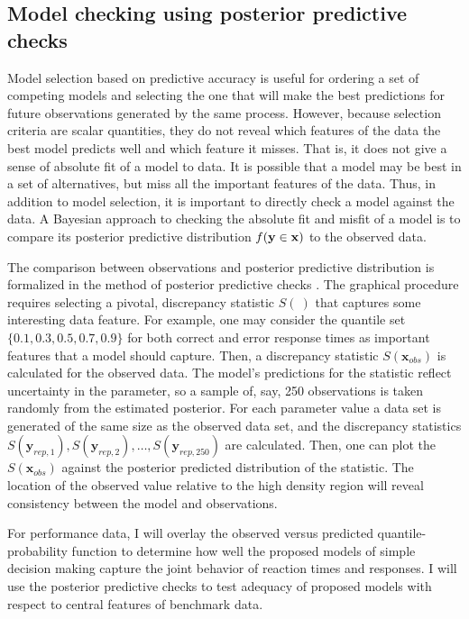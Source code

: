 \documentclass[12pt]{article}
\begin{document}
\subsection{Model checking using posterior predictive checks}

Model selection based on predictive accuracy is useful for ordering a
set of competing models and selecting the one that will make the best
predictions for future observations generated by the same
process. However, because selection criteria are scalar
quantities, they do not reveal which features of the data the
best model predicts well and which feature it misses. That is, it does
not give a sense of absolute fit of a model to data. It is possible
that a model may be best in a set of alternatives, but miss all the
important features of the data. Thus, in addition to model
selection, it is important to directly check a model against the data. A
Bayesian approach to checking the absolute fit and misfit of a
model is to compare its posterior predictive distribution $f(\bf{y} \in \bf{x})$ to the observed data.

The comparison between observations and posterior predictive
distribution is formalized in the method of posterior predictive
checks \citep{GelGoe2000,GelCar2013}.  The graphical procedure requires selecting a pivotal, discrepancy
statistic $S(\:)$ that captures some interesting data feature. For
example, one may consider the quantile set $\{0.1, 0.3, 0.5, 0.7,
0.9\}$ for both correct and error response times as important features
that a model should capture. Then, a discrepancy statistic
$S(\boldsymbol{x}_{obs})$ is calculated for the observed data. The
model's predictions for the statistic  reflect
uncertainty in the parameter, so a sample of, say, 250
observations is taken randomly from the estimated posterior. For each
parameter value a data set is generated of the same size as the
observed data set, and the discrepancy statistics
$S(\boldsymbol{y}_{rep,1}), S(\boldsymbol{y}_{rep,2}), \dots,
S(\boldsymbol{y}_{rep,250})$ are calculated. Then, one can plot the
$S(\boldsymbol{x}_{obs})$ against the posterior predicted distribution
of the statistic. The location of the observed value relative to the
high density region will reveal consistency between the model and
observations.
    
For performance data, I will overlay the observed versus predicted quantile-probability function to determine how well the
proposed models of simple decision making capture the joint behavior
of reaction times and responses. I will use the posterior predictive
checks to test adequacy of proposed models with respect to central
features of benchmark data.
\end{document}
